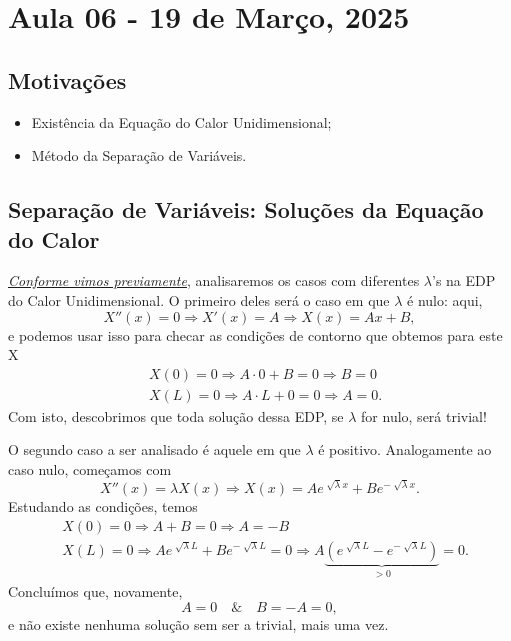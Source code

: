 \documentclass[../pde_notes.tex]{subfiles}
\begin{document}
\section{Aula 06 - 19 de Março, 2025}
\subsection{Motivações}
\begin{itemize}
	\item Existência da Equação do Calor Unidimensional;
	\item Método da Separação de Variáveis.
\end{itemize}
\subsection{Separação de Variáveis: Soluções da Equação do Calor}
\hyperlink{next_class_5}{\textit{Conforme vimos previamente}}, analisaremos os casos com diferentes \(\lambda \)'s na EDP do Calor Unidimensional. O primeiro deles será o caso em que \(\lambda \) é nulo: aqui,
\[
	X''(x)=0 \Rightarrow X'(x)=A \Rightarrow X(x)=Ax + B,
\]
e podemos usar isso para checar as condições de contorno que obtemos para este X
\begin{align*}
	 & X(0)=0 \Rightarrow A \cdot 0 + B = 0 \Rightarrow B = 0  \\
	 & X(L)=0 \Rightarrow A \cdot L + 0 = 0 \Rightarrow A = 0.
\end{align*}
Com isto, descobrimos que toda solução dessa EDP, se \(\lambda \) for nulo, será trivial!

O segundo caso a ser analisado é aquele em que \(\lambda \) é positivo. Analogamente ao caso nulo, começamos com
\[
	X''(x)=\lambda X(x) \Rightarrow X(x)=Ae^{\sqrt[]{\lambda }x} + B e^{-\sqrt[]{\lambda } x}.
\]
Estudando as condições, temos
\begin{align*}
	 & X(0)=0 \Rightarrow A + B = 0 \Rightarrow A = -B                                                                                                           \\
	 & X(L)=0 \Rightarrow Ae^{\sqrt[]{\lambda }L}+Be^{-\sqrt[]{\lambda }L}=0 \Rightarrow A \underbrace{(e^{\sqrt[]{\lambda }L}-e^{-\sqrt[]{\lambda }L})}_{>0}=0.
\end{align*}
Concluímos que, novamente,
\[
	A = 0 \quad\&\quad B=-A=0,
\]
e não existe nenhuma solução sem ser a trivial, mais uma vez.
\end{document}
